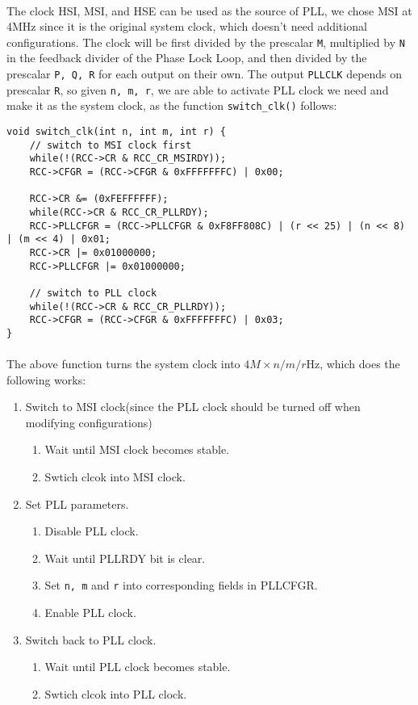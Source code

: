 \paragraph{}
The clock HSI, MSI, and HSE can be used as the source of PLL, 
we chose MSI at 4MHz since it is the original system clock, which doesn't need additional configurations.
The clock will be first divided by the prescalar \texttt{M},
multiplied by \texttt{N} in the feedback divider of the Phase Lock Loop,
and then divided by the prescalar \texttt{P, Q, R} for each output on their own.
The output \texttt{PLLCLK} depends on prescalar \texttt{R}, so given \texttt{n, m, r}, 
we are able to activate PLL clock we need and make it as the system clock, as the function \texttt{switch\_clk()} follows:
\begin{lstlisting}
void switch_clk(int n, int m, int r) {
	// switch to MSI clock first
	while(!(RCC->CR & RCC_CR_MSIRDY));
	RCC->CFGR = (RCC->CFGR & 0xFFFFFFFC) | 0x00;

	RCC->CR &= (0xFEFFFFFF);
	while(RCC->CR & RCC_CR_PLLRDY);
	RCC->PLLCFGR = (RCC->PLLCFGR & 0xF8FF808C) | (r << 25) | (n << 8) | (m << 4) | 0x01;
	RCC->CR |= 0x01000000;
	RCC->PLLCFGR |= 0x01000000;

	// switch to PLL clock
	while(!(RCC->CR & RCC_CR_PLLRDY));
	RCC->CFGR = (RCC->CFGR & 0xFFFFFFFC) | 0x03;
}
\end{lstlisting}
\paragraph{}
The above function turns the system clock into $4M \times n / m / r$Hz,
which does the following works:
\begin{enumerate}
    \item Switch to MSI clock(since the PLL clock should be turned off when modifying configurations)
    \begin{enumerate}
        \item Wait until MSI clock becomes stable.
        \item Swtich clcok into MSI clock.
    \end{enumerate}
    \item Set PLL parameters.
    \begin{enumerate}
        \item Disable PLL clock.
        \item Wait until PLLRDY bit is clear.
        \item Set \texttt{n, m} and \texttt{r} into corresponding fields in PLLCFGR.
        \item Enable PLL clock.
    \end{enumerate}
    \item Switch back to PLL clock.
    \begin{enumerate}
        \item Wait until PLL clock becomes stable.
        \item Swtich clcok into PLL clock.
    \end{enumerate}
\end{enumerate}
